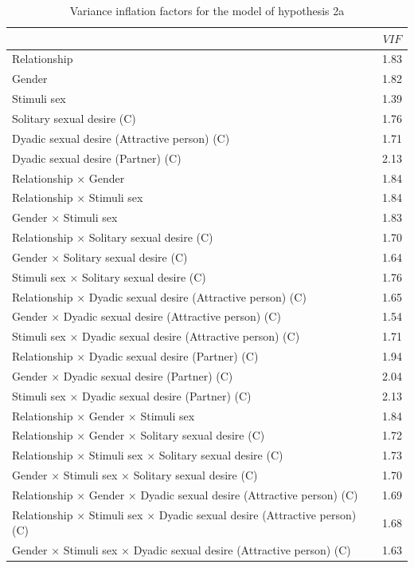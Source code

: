 \documentclass[
  bookmarksnumbered]{article}
\begin{document}
\begin{table}[H]

\caption{\label{tab:coli-m2a}Variance inflation factors for the model of hypothesis 2a}
\centering
\begin{tabular}[t]{lc}
\toprule
  & $VIF$\\
\midrule
Relationship & 1.83\\
Gender & 1.82\\
Stimuli sex & 1.39\\
Solitary sexual desire (C) & 1.76\\
Dyadic sexual desire (Attractive person) (C) & 1.71\\
Dyadic sexual desire (Partner) (C) & 2.13\\
Relationship × Gender & 1.84\\
Relationship × Stimuli sex & 1.84\\
Gender × Stimuli sex & 1.83\\
Relationship × Solitary sexual desire (C) & 1.70\\
Gender × Solitary sexual desire (C) & 1.64\\
Stimuli sex × Solitary sexual desire (C) & 1.76\\
Relationship × Dyadic sexual desire (Attractive person) (C) & 1.65\\
Gender × Dyadic sexual desire (Attractive person) (C) & 1.54\\
Stimuli sex × Dyadic sexual desire (Attractive person) (C) & 1.71\\
Relationship × Dyadic sexual desire (Partner) (C) & 1.94\\
Gender × Dyadic sexual desire (Partner) (C) & 2.04\\
Stimuli sex × Dyadic sexual desire (Partner) (C) & 2.13\\
Relationship × Gender × Stimuli sex & 1.84\\
Relationship × Gender × Solitary sexual desire (C) & 1.72\\
Relationship × Stimuli sex × Solitary sexual desire (C) & 1.73\\
Gender × Stimuli sex × Solitary sexual desire (C) & 1.70\\
Relationship × Gender × Dyadic sexual desire (Attractive person) (C) & 1.69\\
Relationship × Stimuli sex × Dyadic sexual desire (Attractive person) (C) & 1.68\\
Gender × Stimuli sex × Dyadic sexual desire (Attractive person) (C) & 1.63\\

\end{tabular}
\end{table}
\end{document}
